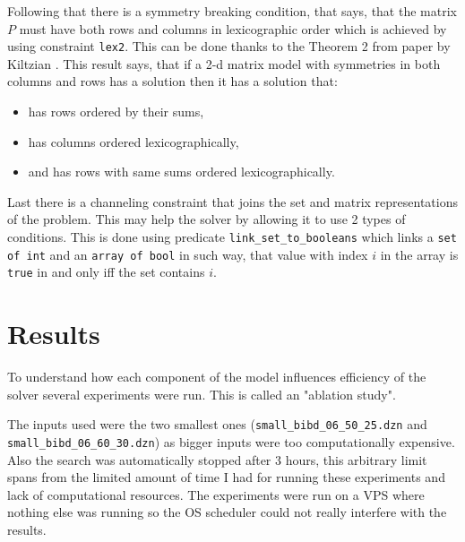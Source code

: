 \documentclass{article}
\begin{document}
Following that there is a symmetry breaking condition, that says, that the matrix $P$ must have both rows and columns in lexicographic order which is achieved by using constraint \texttt{lex2}. This can be done thanks to the Theorem 2 from paper by Kiltzian \cite{Symmetry}. This result says, that if a 2-d matrix model with symmetries in both columns and rows has a solution then it has a solution that: \begin{itemize}
    \item has rows ordered by their sums, 
    \item has columns ordered lexicographically, 
    \item and has rows with same sums ordered lexicographically.
\end{itemize}

Last there is a channeling constraint that joins the set and matrix representations of the problem. This may help the solver by allowing it to use 2 types of conditions. This is done using predicate \texttt{link\_set\_to\_booleans} which links a \texttt{set of int} and an \texttt{array of bool} in such way, that value with index $i$ in the array is \texttt{true} in and only iff the set contains $i$.

\section{Results}
To understand how each component of the model influences efficiency of the solver several experiments were run. This is called an "ablation study".



The inputs used were the two smallest ones (\texttt{small\_bibd\_06\_50\_25.dzn} and \texttt{small\_bibd\_06\_60\_30.dzn}) as bigger inputs were too computationally expensive. Also the search was automatically stopped after 3 hours, this arbitrary limit spans from the limited amount of time I had for running these experiments and lack of computational resources. The experiments were run on a VPS where nothing else was running so the OS scheduler could not really interfere with the results.
\end{document}
